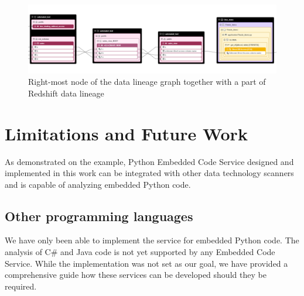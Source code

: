 \begin{figure}[ht]\centering
\includegraphics[angle=90,origin=c,height=1.0\textwidth]{img/thesis_demo4.PNG}
\caption{Right-most node of the data lineage graph together with a part of Redshift data lineage}
\label{fig:thesisDemo4}
\end{figure}

\section{Limitations and Future Work}

As demonstrated on the example, Python Embedded Code Service designed and implemented in this work can be integrated with other data technology scanners and is capable of analyzing embedded Python code.

\subsection{Other programming languages}
We have only been able to implement the service for embedded Python code. The analysis of C\# and Java code is not yet supported by any Embedded Code Service. While the implementation was not set as our goal, we have provided a comprehensive guide how these services can be developed should they be required.

